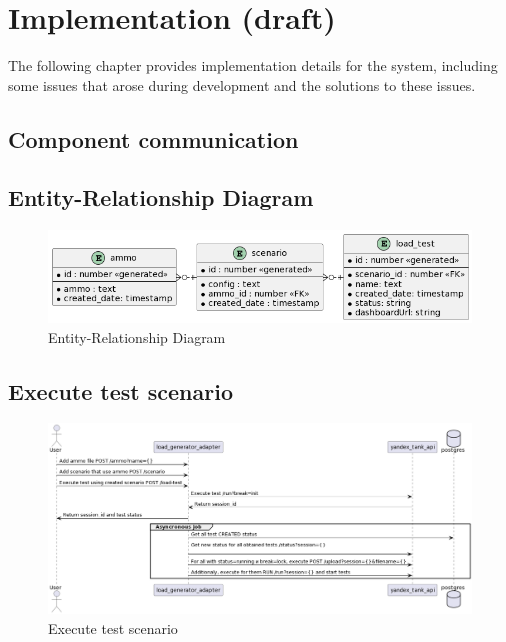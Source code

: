 \graphicspath{{figs/}} %
\chapter{Implementation (draft)}
\label{ch:lr}


\lstset{style=mystyle}


The following chapter provides implementation details for the system, including some issues that arose during development and the solutions to these issues.

\section{Component communication}\label{sec:communication}


\section{Entity-Relationship Diagram}

\begin{figure}[t]
    \centering
    \includegraphics[height=\textheight,width=\textwidth,keepaspectratio]{erl.png}
    \caption{Entity-Relationship Diagram}
    \label{fig:erl}
\end{figure}


\section{Execute test scenario}

\begin{figure}[t]
    \centering
    \includegraphics[height=\textheight,width=\textwidth,keepaspectratio]{diagram.png}
    \caption{Execute test scenario}
    \label{fig:test_scenario}
\end{figure}


